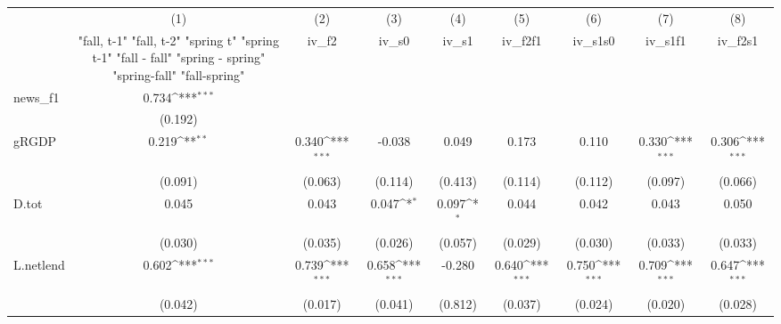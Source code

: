 {
\def\sym#1{\ifmmode^{#1}\else\(^{#1}\)\fi}
\begin{tabular}{l*{8}{c}}
\toprule
            &\multicolumn{1}{c}{(1)}&\multicolumn{1}{c}{(2)}&\multicolumn{1}{c}{(3)}&\multicolumn{1}{c}{(4)}&\multicolumn{1}{c}{(5)}&\multicolumn{1}{c}{(6)}&\multicolumn{1}{c}{(7)}&\multicolumn{1}{c}{(8)}\\
            &\multicolumn{1}{c}{  "fall, t-1" "fall, t-2" "spring t" "spring t-1"  "fall - fall" "spring - spring" "spring-fall" "fall-spring" }&\multicolumn{1}{c}{iv\_f2}&\multicolumn{1}{c}{iv\_s0}&\multicolumn{1}{c}{iv\_s1}&\multicolumn{1}{c}{iv\_f2f1}&\multicolumn{1}{c}{iv\_s1s0}&\multicolumn{1}{c}{iv\_s1f1}&\multicolumn{1}{c}{iv\_f2s1}\\
\midrule
news\_f1     &       0.734\sym{***}&                     &                     &                     &                     &                     &                     &                     \\
            &     (0.192)         &                     &                     &                     &                     &                     &                     &                     \\
\addlinespace
gRGDP       &       0.219\sym{**} &       0.340\sym{***}&      -0.038         &       0.049         &       0.173         &       0.110         &       0.330\sym{***}&       0.306\sym{***}\\
            &     (0.091)         &     (0.063)         &     (0.114)         &     (0.413)         &     (0.114)         &     (0.112)         &     (0.097)         &     (0.066)         \\
\addlinespace
D.tot       &       0.045         &       0.043         &       0.047\sym{*}  &       0.097\sym{*}  &       0.044         &       0.042         &       0.043         &       0.050         \\
            &     (0.030)         &     (0.035)         &     (0.026)         &     (0.057)         &     (0.029)         &     (0.030)         &     (0.033)         &     (0.033)         \\
\addlinespace
L.netlend   &       0.602\sym{***}&       0.739\sym{***}&       0.658\sym{***}&      -0.280         &       0.640\sym{***}&       0.750\sym{***}&       0.709\sym{***}&       0.647\sym{***}\\
            &     (0.042)         &     (0.017)         &     (0.041)         &     (0.812)         &     (0.037)         &     (0.024)         &     (0.020)         &     (0.028)         \\

\end{tabular}}
